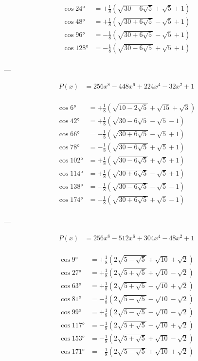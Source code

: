 $$
\begin{aligned}
    \cos 24°  &= +\frac{1}{8} \left(\sqrt{30-6\sqrt{5}}+\sqrt{5}+1\right)\\
    \cos 48°  &= +\frac{1}{8} \left(\sqrt{30+6\sqrt{5}}-\sqrt{5}+1\right)\\
    \cos 96°  &= -\frac{1}{8} \left(\sqrt{30+6\sqrt{5}}-\sqrt{5}+1\right)\\
    \cos 128° &= -\frac{1}{8} \left(\sqrt{30-6\sqrt{5}}+\sqrt{5}+1\right)\\
\end{aligned}
$$

---

$$
\begin{aligned}
    P(x) &= 256 x^8-448 x^6+224 x^4-32 x^2+1\\
\end{aligned}
$$

$$
\begin{aligned}
    \cos 6°   &= +\frac{1}{8} \left(\sqrt{10-2\sqrt{5}}+\sqrt{15}+\sqrt{3}\right)\\
    \cos 42°  &= +\frac{1}{8} \left(\sqrt{30-6\sqrt{5}}-\sqrt{5}-1\right)\\
    \cos 66°  &= -\frac{1}{8} \left(\sqrt{30+6\sqrt{5}}-\sqrt{5}+1\right)\\
    \cos 78°  &= -\frac{1}{8} \left(\sqrt{30-6\sqrt{5}}+\sqrt{5}+1\right)\\
    \cos 102° &= +\frac{1}{8} \left(\sqrt{30-6\sqrt{5}}+\sqrt{5}+1\right)\\
    \cos 114° &= +\frac{1}{8} \left(\sqrt{30+6\sqrt{5}}-\sqrt{5}+1\right)\\
    \cos 138° &= -\frac{1}{8} \left(\sqrt{30-6\sqrt{5}}-\sqrt{5}-1\right)\\
    \cos 174° &= -\frac{1}{8} \left(\sqrt{30+6\sqrt{5}}+\sqrt{5}-1\right)\\
\end{aligned}
$$

---

$$
\begin{aligned}
    P(x) &= 256 x^8-512 x^6+304 x^4-48 x^2+1\\
\end{aligned}
$$

$$
\begin{aligned}
    \cos 9°   &= +\frac{1}{8} \left(2\sqrt{5-\sqrt{5}}+\sqrt{10}+\sqrt{2}\right)\\
    \cos 27°  &= +\frac{1}{8} \left(2\sqrt{5+\sqrt{5}}+\sqrt{10}-\sqrt{2}\right)\\
    \cos 63°  &= +\frac{1}{8} \left(2\sqrt{5+\sqrt{5}}-\sqrt{10}+\sqrt{2}\right)\\
    \cos 81°  &= -\frac{1}{8} \left(2\sqrt{5-\sqrt{5}}-\sqrt{10}-\sqrt{2}\right)\\
    \cos 99°  &= +\frac{1}{8} \left(2\sqrt{5-\sqrt{5}}-\sqrt{10}-\sqrt{2}\right)\\
    \cos 117° &= -\frac{1}{8} \left(2\sqrt{5+\sqrt{5}}-\sqrt{10}+\sqrt{2}\right)\\
    \cos 153° &= -\frac{1}{8} \left(2\sqrt{5+\sqrt{5}}+\sqrt{10}-\sqrt{2}\right)\\
    \cos 171° &= -\frac{1}{8} \left(2\sqrt{5-\sqrt{5}}+\sqrt{10}+\sqrt{2}\right)\\
\end{aligned}
$$